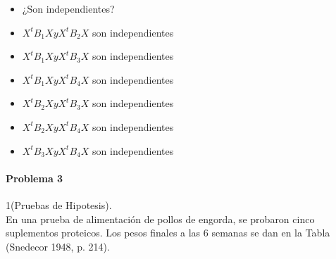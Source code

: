 \documentclass[12pt,a4paper]{report}
\begin{document}
\begin{itemize}
\begin{verbatim}
> #Idempotencia
> B12=B1%*%B1
> Idem_B1 = all.equal(B1, B12)
> Idem_B1
[1] TRUE
> 
> B22=B2%*%B2
> Idem_B2 = all.equal(B2, B22)
> Idem_B2
[1] TRUE
> 
> B32=B3%*%B3
> Idem_B3 = all.equal(B3, B32)
> Idem_B3
[1] TRUE
> B42=B4%*%B4
> Idem_B4 = all.equal(B4, B42)
> Idem_B4
[1] TRUE
\end{verbatim}
Son idempotentes.\\

$r(A_i)=r_i$ y $A=\sum_{i=1}^{n}A_{i}$ con $r(A)=r$:\\ 
\begin{verbatim}
 R(B1)
[1] 2
> R(B2)
[1] 1
> R(B3)
[1] 2
> R(B4)
[1] 1
> B=B1+B2+B3+B4
> R(B)
[1] 6
\end{verbatim}
Por lo tanto: 
\begin{align*}
* X^{t}{B_1}X & \thicksim \chi^{2}_{(2,\dfrac{1}{2} \mu^{t} B_{1} \mu)}\\
* X^{t}{B_2}X &\thicksim \chi^{2}_{(1,\dfrac{1}{2} \mu^{t} B_{2} \mu)}\\
* X^{t}{B_3}X &\thicksim \chi^{2}_{(2,\dfrac{1}{2} \mu^{t} B_{3} \mu)}\\
* X^{t}{B_4}X &\thicksim \chi^{2}_{(1,\dfrac{1}{2} \mu^{t} B_{4} \mu)}\\
\end{align*}
 \item[b)]¿Son independientes?\\
 
 \item $X^{t}{B_1}X y X^{t}{B_2}X$ son independientes
 \item $X^{t}{B_1}X y X^{t}{B_3}X$ son independientes
 \item $X^{t}{B_1}X y X^{t}{B_4}X$ son independientes
 \item $X^{t}{B_2}X y X^{t}{B_3}X$ son independientes
 \item $X^{t}{B_2}X y X^{t}{B_4}X$ son independientes
 \item $X^{t}{B_3}X y X^{t}{B_4}X$ son independientes
\end{itemize}




\paragraph{Problema 3}  1(Pruebas de Hipotesis).\\

\noindent En una prueba de alimentación de pollos de engorda, se probaron cinco suplementos proteicos. Los pesos finales a las 6 semanas se dan en la Tabla (Snedecor 1948, p. 214).
\end{document}

